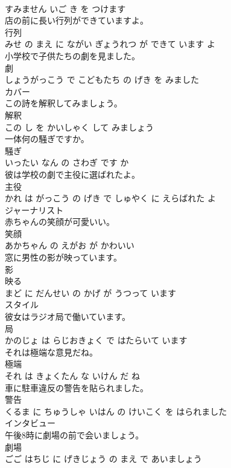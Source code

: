 \documentclass[8pt]{extreport}
\begin{document}
\begin{CJK}{UTF8}{min}
\\	すみません いご き を つけます			
\\	店の前に長い行列ができていますよ。	
\\	行列 
\\	みせ の まえ に ながい ぎょうれつ が できて います よ			
\\	小学校で子供たちの劇を見ました。	
\\	劇 
\\	しょうがっこう で こどもたち の げき を みました			
\\	カバー	
\\	この詩を解釈してみましょう。	
\\	解釈 
\\	この し を かいしゃく して みましょう			
\\	一体何の騒ぎですか。	
\\	騒ぎ 
\\	いったい なん の さわぎ です か			
\\	彼は学校の劇で主役に選ばれたよ。	
\\	主役 
\\	かれ は がっこう の げき で しゅやく に えらばれた よ			
\\	ジャーナリスト	
\\	赤ちゃんの笑顔が可愛いい。	
\\	笑顔 
\\	あかちゃん の えがお が かわいい			
\\	窓に男性の影が映っています。	
\\	影 
\\	映る 
\\	まど に だんせい の かげ が うつって います			
\\	スタイル	
\\	彼女はラジオ局で働いています。	
\\	局 
\\	かのじょ は らじおきょく で はたらいて います			
\\	それは極端な意見だね。	
\\	極端 
\\	それ は きょくたん な いけん だ ね			
\\	車に駐車違反の警告を貼られました。	
\\	警告 
\\	くるま に ちゅうしゃ いはん の けいこく を はられました			
\\	インタビュー	
\\	午後8時に劇場の前で会いましょう。	
\\	劇場 
\\	ごご はちじ に げきじょう の まえ で あいましょう			

\end{CJK}
\end{document}
